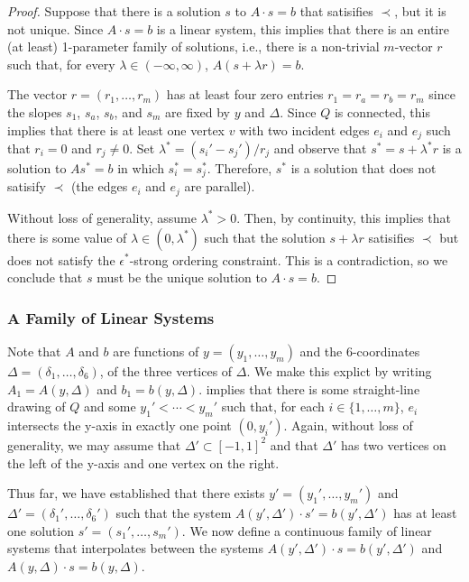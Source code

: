 \documentclass{patmorin}
\begin{document}
\begin{proof}
   Suppose that there is a solution $s$ to $A\cdot s=b$ that satisifies $\prec$,
   but it is not unique.  Since $A\cdot s=b$ is a linear system, this implies
   that there is an entire (at least) 1-parameter family of solutions,
   i.e., there is a non-trivial $m$-vector $r$ such that, for every
   $\lambda\in(-\infty,\infty)$, $A(s+\lambda r)=b$.

   The vector $r=(r_1,\ldots,r_m)$ has at least four zero entries
   $r_1=r_a=r_b=r_m$ since the slopes $s_1$, $s_a$, $s_b$, and $s_m$
   are fixed by $y$ and $\Delta$.  Since $Q$ is connected, this implies
   that there is at least one vertex $v$ with two incident edges $e_i$
   and $e_j$ such that $r_i=0$ and $r_j\neq 0$.  Set $\lambda^* =
   (s_i'-s_j')/r_j$ and observe that $s^*=s+\lambda^* r$ is a solution
   to $As^*=b$ in which $s_i^*=s_j^*$.  Therefore, $s^*$ is a solution that
   does not satisify $\prec$ (the edges $e_i$ and $e_j$
   are parallel).  

   Without loss of generality, assume $\lambda^* >0$. Then, by continuity,
   this implies that there is some value of $\lambda\in (0,\lambda^*)$
   such that the solution $s+\lambda r$ satisifies $\prec$ but does
   not satisfy the $\epsilon^*$-strong ordering constraint.  This is a
   contradiction, so we conclude that $s$ must be the unique solution
   to $A\cdot s=b$.
\end{proof}

\subsubsection{A Family of Linear Systems}

   Note that $A$ and $b$ are functions of $y=(y_1,\ldots,y_m)$
   and the 6-coordinates $\Delta=(\delta_1,\ldots,\delta_6)$, of
   the three vertices of $\Delta$.  We make this explict by writing
   $A_1=A(y,\Delta)$ and $b_1=b(y,\Delta)$.  
   implies that there is some straight-line drawing of $Q$ and some
   $y_1'<\cdots< y_m'$ such that, for each $i\in\{1,\ldots,m\}$, $e_i$
   intersects the y-axis in exactly one point $(0,y_i')$.  Again, without loss
   of generality, we may assume that $\Delta'\subset [-1,1]^2$ and that
   $\Delta'$ has two vertices on the left of the y-axis and one vertex
   on the right.

   Thus far, we have established that there exists $y'=(y_1',\ldots,y_m')$
   and $\Delta'=(\delta_1',\ldots,\delta_6')$ such that the
   system $A(y',\Delta')\cdot s' = b(y',\Delta')$ has at least one
   solution $s'=(s_1',\ldots,s_m')$.  We now define a continuous
   family of linear systems that interpolates between the systems
   $A(y',\Delta')\cdot s=b(y',\Delta')$ and $A(y,\Delta)\cdot s=b(y,\Delta)$.
\end{document}
